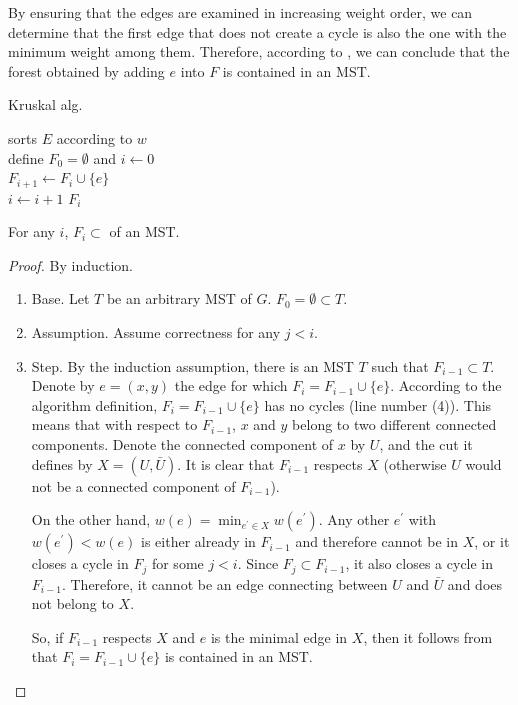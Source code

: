 By ensuring that the edges are examined in increasing weight order, we can determine that the first edge that does not create a cycle is also the one with the minimum weight among them. Therefore, according to , we can conclude that the forest obtained by adding $e$ into $F$ is contained in an MST.

\begin{algorithm} 
\SetAlgoLined
{}
\caption{ Kruskal alg.}
sorts  $E$ according to $w$ \\
define $F_{0} = \emptyset$ and $i \leftarrow 0$ \\
 {
   {
    $F_{i+1} \leftarrow F_{i} \cup \{e\}$ \\
    $i \leftarrow i + 1$
  }
}
\Return $F_{i}$
  \label{alg:krus}
\end{algorithm}

\begin{claim}
  For any $i$, $F_{i} \subset $ of an MST.
\end{claim}
\begin{proof}
  By induction. 
  \begin{enumerate}
    \item Base. Let $T$ be an arbitrary MST of $G$. $F_{0} = \emptyset \subset T $.
    \item Assumption. Assume correctness for any $j < i$. 
    \item Step. By the induction assumption, there is an MST $T$ such that $F_{i-1} \subset T$. Denote by $e=(x,y)$ the edge for which $F_{i} = F_{i-1}\cup \{e\}$. According to the algorithm definition, $F_{i} = F_{i-1} \cup \{e\}$ has no cycles (line number (4)). This means that with respect to $F_{i-1}$, $x$ and $y$ belong to two different connected components. Denote the connected component of $x$ by $U$, and the cut it defines by $X = (U, \bar{U})$. It is clear that $F_{i-1}$ respects $X$ (otherwise $U$ would not be a connected component of $F_{i-1}$).
      

On the other hand, $w(e) = \min_{e^{\prime} \in X}w(e^{\prime})$. Any other $e^{\prime}$ with $w(e^{\prime}) < w(e)$ is either already in $F_{i-1}$ and therefore cannot be in $X$, or it closes a cycle in $F_{j}$ for some $j<i$. Since $F_{j} \subset F_{i-1}$, it also closes a cycle in $F_{i-1}$. Therefore, it cannot be an edge connecting between $U$ and $\bar{U}$ and does not belong to $X$.


So, if $F_{i-1}$ respects $X$ and $e$ is the minimal edge in $X$, then it follows from  that $F_{i} = F_{i-1} \cup \{ e\}$ is contained in an MST.
  \end{enumerate}
\end{proof}

